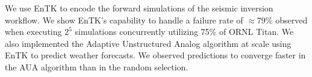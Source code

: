 We use EnTK to encode the forward simulations of the seismic inversion workflow.
We show EnTK's capability to handle a failure rate of \(\approx\)79\% observed
when executing $2^5$ simulations concurrently utilizing 75\% of ORNL Titan. We
also implemented the Adaptive Unstructured Analog algorithm at scale using EnTK 
to predict weather forecasts. We observed predictions to converge faster in the 
AUA algorithm than in the random selection.






